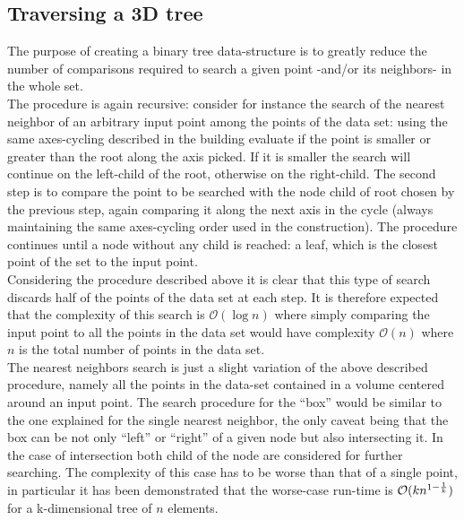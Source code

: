 \subsection{Traversing a 3D tree}
The purpose of creating a binary tree data-structure is to greatly reduce the number of comparisons required to search a given point -and/or its neighbors- in the whole set.\\
The procedure is again recursive: consider for instance the search of the nearest neighbor of an arbitrary input point among the points of the data set: using the same axes-cycling described in the building evaluate if the point is smaller or greater than the root along the axis picked. If it is smaller the search will continue on the left-child of the root, otherwise on the right-child. The second step is to compare the point to be searched with the node child of root chosen by the previous step, again comparing it along the next axis in the cycle (always maintaining the same axes-cycling order used in the construction). The procedure continues until a node without any child is reached: a leaf, which is the closest point of the set to the input point.\\
Considering the procedure described above it is clear that this type of search discards half of the points of the data set at each step. It is therefore expected that the complexity of this search is $\mathcal{O}(\log{} n)$ where simply comparing the input point to all the points in the data set would have complexity $\mathcal{O}(n)$ where $n$ is the total number of points in the data set.\\
The nearest neighbors search is just a slight variation of the above described procedure, namely all the points in the data-set contained in a volume centered around an input point. The search procedure for the ``box'' would be similar to the one explained for the single nearest neighbor, the only caveat being that the box can be not only ``left'' or ``right'' of a given node but also intersecting it. In the case of intersection both child of the node are considered for further searching. The complexity of this case has to be worse than that of a single point, in particular it has been demonstrated \cite{worst-case-search} that the worse-case run-time is $\mathcal{O}(k n ^{1 - {1\over k}})$ for a k-dimensional tree of $n$ elements.

